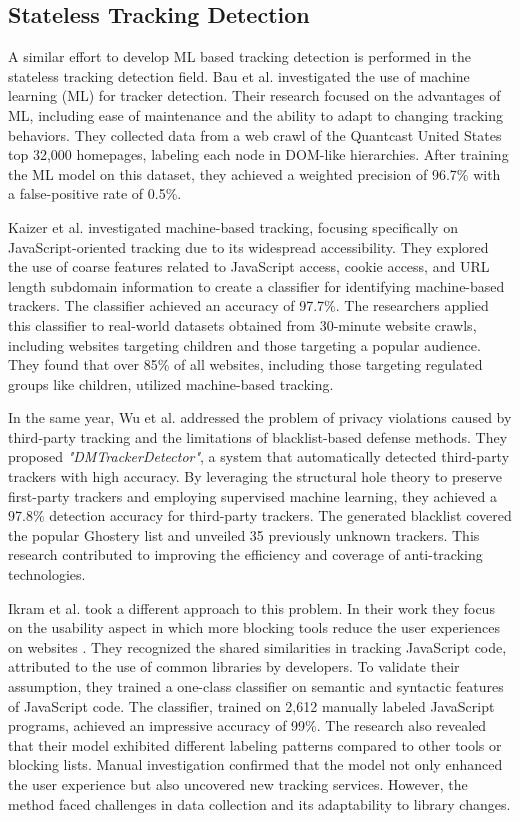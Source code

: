 \subsection{Stateless Tracking Detection}

A similar effort to develop ML based tracking detection is performed in the stateless tracking detection field. Bau et al. \cite{bau2013promising} 
investigated the use of machine learning (ML) for tracker detection. Their research focused on the advantages of ML,
including ease of maintenance and the ability to adapt to changing tracking behaviors. They collected data from a web
crawl of the Quantcast United States top 32,000 homepages, labeling each node in DOM-like hierarchies. After training the ML model
on this dataset, they achieved a weighted precision of 96.7\% with a false-positive rate of 0.5\%.

Kaizer et al. \cite{kaizer2016towards} investigated machine-based tracking, focusing specifically on JavaScript-oriented tracking due to its widespread
accessibility. They explored the use of coarse features related to JavaScript access, cookie access, and URL length subdomain
information to create a classifier for identifying machine-based trackers. The classifier achieved an accuracy of 97.7\%.
The researchers applied this classifier to real-world datasets obtained from 30-minute website crawls, including websites targeting
children and those targeting a popular audience. They found that over 85\% of all websites, including those targeting regulated groups
like children, utilized machine-based tracking.

In the same year, Wu et al. \cite{wu2016machine} addressed the problem of privacy violations caused by third-party tracking and the
limitations of blacklist-based defense methods. They proposed \emph{"DMTrackerDetector"}, a system that automatically detected third-party
trackers with high accuracy. By leveraging the structural hole theory to preserve first-party trackers and employing supervised
machine learning, they achieved a 97.8\% detection accuracy for third-party trackers. The generated blacklist covered the popular
Ghostery \cite{ghostery} list and unveiled 35 previously unknown trackers. This research contributed to improving the efficiency
and coverage of anti-tracking technologies.

Ikram et al. \cite{ikram2016towards} took a different approach to this problem. In their work they focus on the usability aspect
in which more blocking tools reduce the user experiences on websites \cite{leon2012johnny}. They recognized the shared similarities in tracking
JavaScript code, attributed to the use of common libraries by developers. To validate their assumption, they trained a one-class
classifier on semantic and syntactic features of JavaScript code. The classifier, trained on 2,612 manually labeled JavaScript
programs, achieved an impressive accuracy of 99\%. The research also
revealed that their model exhibited different labeling patterns compared to other tools or blocking lists. Manual investigation
confirmed that the model not only enhanced the user experience but also uncovered new tracking services. However, the method
faced challenges in data collection and its adaptability to library changes.

